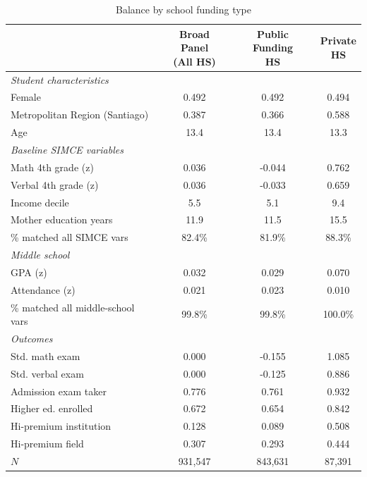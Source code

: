 \begin{table}[H]
\centering
\caption{Balance by school funding type}
\label{tab:balance_school_sector}
\small
\setlength{\tabcolsep}{4pt}
\begin{tabular}{@{}lccc@{}}
\toprule
 & \shortstack{Broad Panel\\(All HS)} & \shortstack{Public Funding\\HS} & \shortstack{Private\\HS} \\
\midrule
\multicolumn{4}{l}{\textit{Student characteristics}} \\[2pt]
Female & 0.492 & 0.492 & 0.494 \\
Metropolitan Region (Santiago) & 0.387 & 0.366 & 0.588 \\
Age & 13.4 & 13.4 & 13.3 \\
\midrule
\multicolumn{4}{l}{\textit{Baseline SIMCE variables}} \\[2pt]
Math 4th grade (z) & 0.036 & -0.044 & 0.762 \\
Verbal 4th grade (z) & 0.036 & -0.033 & 0.659 \\
Income decile & 5.5 & 5.1 & 9.4 \\
Mother education years & 11.9 & 11.5 & 15.5 \\
\quad\footnotesize{\% matched all SIMCE vars} & \footnotesize{82.4\%} & \footnotesize{81.9\%} & \footnotesize{88.3\%} \\
\midrule
\multicolumn{4}{l}{\textit{Middle school}} \\[2pt]
GPA (z) & 0.032 & 0.029 & 0.070 \\
Attendance (z) & 0.021 & 0.023 & 0.010 \\
\quad\footnotesize{\% matched all middle-school vars} & \footnotesize{99.8\%} & \footnotesize{99.8\%} & \footnotesize{100.0\%} \\
\midrule
\multicolumn{4}{l}{\textit{Outcomes}} \\[2pt]
Std. math exam & 0.000 & -0.155 & 1.085 \\
Std. verbal exam & 0.000 & -0.125 & 0.886 \\
Admission exam taker & 0.776 & 0.761 & 0.932 \\
Higher ed. enrolled & 0.672 & 0.654 & 0.842 \\
Hi-premium institution & 0.128 & 0.089 & 0.508 \\
Hi-premium field & 0.307 & 0.293 & 0.444 \\
\midrule
$N$ & 931,547 & 843,631 &  87,391 \\

\end{tabular}
\end{table}

